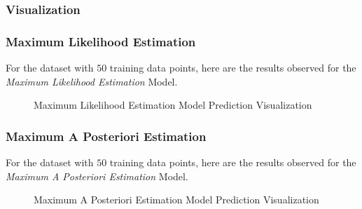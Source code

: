 \documentclass[12pt,twoside,a4paper]{article}
\begin{document}
\subsubsection{Visualization}

\subsubsection*{Maximum Likelihood Estimation}
For the dataset with $50$ training data points, here are the results observed for the \textit{Maximum Likelihood Estimation} Model.
\begin{figure}[H]
    \centering
    \hspace{0mm}
    \hspace{0mm}
    \caption{Maximum Likelihood Estimation Model Prediction Visualization}
    \label{MLFIG}
\end{figure}

\pagebreak
\subsubsection*{Maximum A Posteriori Estimation}
For the dataset with $50$ training data points, here are the results observed for the \textit{Maximum A Posteriori Estimation} Model.
\begin{figure}[H]
    \centering
    \hspace{0mm}
    \hspace{0mm}
    \caption{Maximum A Posteriori Estimation Model Prediction Visualization}
    \label{MAPFIG}
\end{figure}

\end{document}
